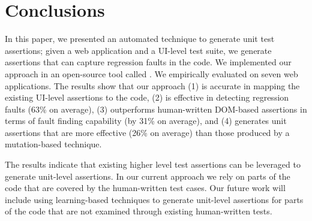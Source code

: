 \section{Conclusions} \label{Sec:concs}
In this paper, we presented an automated technique to generate \javascript unit test assertions; given  a web application and a UI-level test suite, we generate assertions that can capture regression faults in the \javascript code. We implemented our approach in an open-source tool called \atrina. We empirically evaluated \atrina on seven web applications. The results show that our approach (1) is accurate in mapping the existing UI-level assertions to the \javascript code, (2) is effective in detecting regression faults (63\% on average), (3) outperforms human-written DOM-based assertions in terms of fault finding capability (by 31\% on average), and (4) generates unit assertions that are more effective (26\% on average) than those produced by a mutation-based technique.

The results indicate that existing higher level test assertions can be leveraged to generate unit-level assertions. In our current approach we rely on parts of the code that are covered by the human-written test cases. Our future work will include using learning-based techniques to generate unit-level assertions for parts of the code that are not examined through existing human-written tests.     
